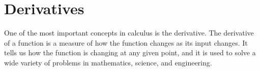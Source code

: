 \chapter{Derivatives}
One of the most important concepts in calculus is the derivative. The derivative of a function is a measure of how the function changes as its input changes. It tells us how the function is changing at any given point, and it is used to solve a wide variety of problems in mathematics, science, and engineering.